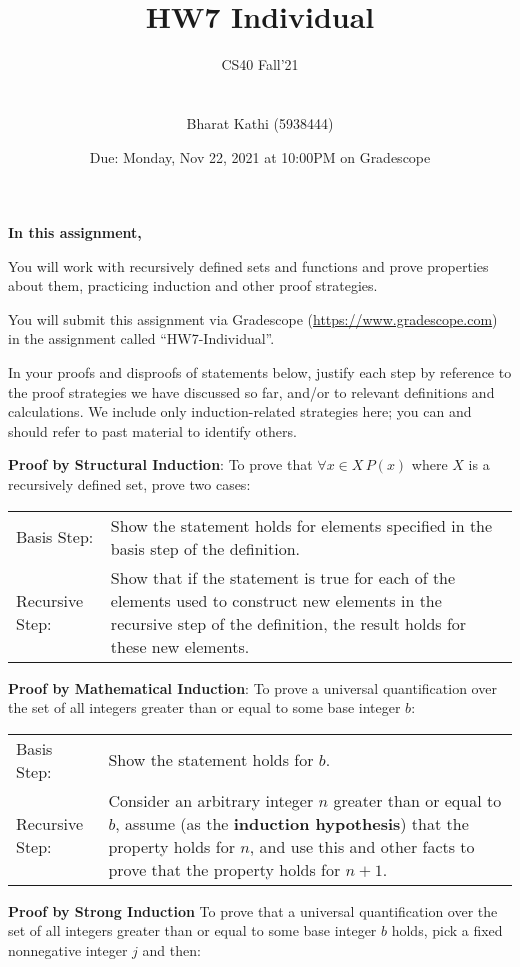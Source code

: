 \documentclass[12pt, oneside]{article}
\title{HW7 Individual}
\author{CS40 Fall'21\\\\\\
Bharat Kathi (5938444)}
\date{Due: Monday, Nov 22, 2021 at 10:00PM on Gradescope}
\begin{document}
\maketitle

{\bf In this assignment,}

You will work with recursively defined sets and functions and prove properties about them, practicing induction
and other proof strategies.

You will submit this assignment via Gradescope
(\href{https://www.gradescope.com}{https://www.gradescope.com}) in the assignment called ``HW7-Individual''.


In your proofs and disproofs of statements below, justify each  step
by reference to the proof strategies
we have discussed so far, and/or to relevant definitions and calculations. We include only induction-related strategies here; you can and should refer to past material to identify others.



{\bf Proof by Structural Induction}: To prove that $\forall x \in X \, P(x)$ where $X$ is a recursively defined set, prove two cases:
    
    \begin{tabularx}{\textwidth}{l X}
    Basis Step: & Show the statement holds for elements specified in the basis step of the definition. \\
    Recursive Step: & Show that if the statement is true for each of the elements used to construct
new elements in the recursive step of the definition, the result holds for these new elements.
\end{tabularx}


{\bf Proof by Mathematical Induction}: To prove a universal quantification over the set of  all integers greater than  or  equal to some base integer $b$:

\begin{tabularx}{\textwidth}{l X}
    Basis Step: & Show the statement holds for $b$. \\
    Recursive Step: & Consider an arbitrary integer $n$ greater than or  equal to  $b$, assume
    (as the {\bf induction hypothesis})  that the property holds  for $n$, and use  this and
    other facts to  prove that  the property holds for $n+1$.
\end{tabularx}

{\bf Proof by Strong Induction} To prove that a universal quantification over the set of all integers greater than or equal to some  base integer $b$ holds,  pick a  fixed nonnegative integer  $j$ and then: \hfill 
\end{document}
